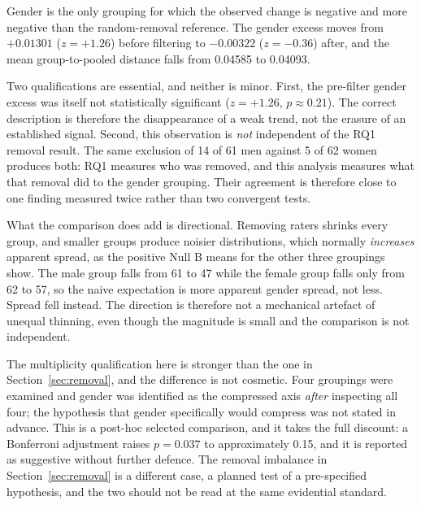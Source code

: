 \documentclass[11pt,a4paper]{article}
\begin{document}
Gender is the only grouping for which the observed change is negative and more negative than the
random-removal reference. The gender excess moves from $+0.01301$ ($z = +1.26$) before filtering
to $-0.00322$ ($z = -0.36$) after, and the mean group-to-pooled distance falls from 0.04585 to
0.04093.

Two qualifications are essential, and neither is minor. First, the pre-filter gender excess was
itself not statistically significant ($z = +1.26$, $p \approx 0.21$). The correct description is
therefore the disappearance of a weak trend, not the erasure of an established signal. Second,
this observation is \emph{not} independent of the RQ1 removal result. The same exclusion of 14 of
61 men against 5 of 62 women produces both: RQ1 measures who was removed, and this analysis
measures what that removal did to the gender grouping. Their agreement is therefore close to one
finding measured twice rather than two convergent tests.

What the comparison does add is directional. Removing raters shrinks every group, and smaller
groups produce noisier distributions, which normally \emph{increases} apparent spread, as the
positive Null B means for the other three groupings show. The male group falls from 61 to 47
while the female group falls only from 62 to 57, so the naive expectation is more apparent gender
spread, not less. Spread fell instead. The direction is therefore not a mechanical artefact of
unequal thinning, even though the magnitude is small and the comparison is not independent.

The multiplicity qualification here is stronger than the one in Section~\ref{sec:removal}, and the
difference is not cosmetic. Four groupings were examined and gender was identified as the
compressed axis \emph{after} inspecting all four; the hypothesis that gender specifically would
compress was not stated in advance. This is a post-hoc selected comparison, and it takes the full
discount: a Bonferroni adjustment raises $p = 0.037$ to approximately 0.15, and it is reported as
suggestive without further defence. The removal imbalance in Section~\ref{sec:removal} is a
different case, a planned test of a pre-specified hypothesis, and the two should not be read
at the same evidential standard.
\end{document}
